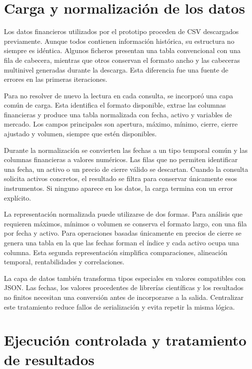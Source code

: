\section{Carga y normalización de los datos}

Los datos financieros utilizados por el prototipo proceden de CSV descargados previamente. Aunque todos contienen información histórica, su estructura no siempre es idéntica. Algunos ficheros presentan una tabla convencional con una fila de cabecera, mientras que otros conservan el formato ancho y las cabeceras multinivel generadas durante la descarga. Esta diferencia fue una fuente de errores en las primeras iteraciones.

Para no resolver de nuevo la lectura en cada consulta, se incorporó una capa común de carga. Esta identifica el formato disponible, extrae las columnas financieras y produce una tabla normalizada con fecha, activo y variables de mercado. Los campos principales son apertura, máximo, mínimo, cierre, cierre ajustado y volumen, siempre que estén disponibles.

Durante la normalización se convierten las fechas a un tipo temporal común y las columnas financieras a valores numéricos. Las filas que no permiten identificar una fecha, un activo o un precio de cierre válido se descartan. Cuando la consulta solicita activos concretos, el resultado se filtra para conservar únicamente esos instrumentos. Si ninguno aparece en los datos, la carga termina con un error explícito.

La representación normalizada puede utilizarse de dos formas. Para análisis que requieren máximos, mínimos o volumen se conserva el formato largo, con una fila por fecha y activo. Para operaciones basadas únicamente en precios de cierre se genera una tabla en la que las fechas forman el índice y cada activo ocupa una columna. Esta segunda representación simplifica comparaciones, alineación temporal, rentabilidades y correlaciones.

La capa de datos también transforma tipos especiales en valores compatibles con JSON. Las fechas, los valores procedentes de librerías científicas y los resultados no finitos necesitan una conversión antes de incorporarse a la salida. Centralizar este tratamiento reduce fallos de serialización y evita repetir la misma lógica.

\section{Ejecución controlada y tratamiento de resultados}


